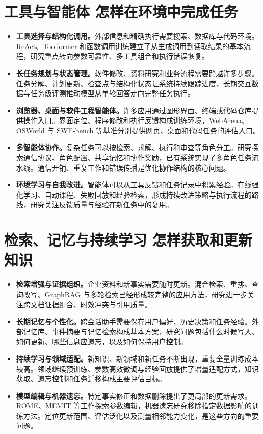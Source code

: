 \section{工具与智能体 怎样在环境中完成任务}

\begin{itemize}
    \item \textbf{工具选择与结构化调用。}外部信息和精确执行需要搜索、数据库与代码环境。ReAct、Toolformer 和函数调用训练建立了从生成调用到读取结果的基本流程，研究重点转向参数可靠性、多工具组合和执行错误恢复。
    \item \textbf{长任务规划与状态管理。}软件修改、资料研究和业务流程需要跨越许多步骤。任务分解、计划更新、检查点与结构化状态让系统持续跟踪进度，长期交互数据与任务级评测推动模型从单轮回答走向完整任务执行。
    \item \textbf{浏览器、桌面与软件工程智能体。}许多应用通过图形界面、终端或代码仓库提供操作入口。界面定位、程序修改和执行反馈构成训练环境，WebArena、OSWorld 与 SWE-bench 等基准分别提供网页、桌面和代码任务的评估入口。
    \item \textbf{多智能体协作。}复杂任务可以按检索、求解、执行和审查等角色分工。研究探索通信协议、角色配置、共享记忆和协作奖励，已有系统实现了多角色任务流水线。通信开销、重复工作和错误传播是优化协作结构的核心问题。
    \item \textbf{环境学习与自我改进。}智能体可以从工具反馈和任务记录中积累经验。在线强化学习、自动课程、失败回放和经验检索，形成持续改进策略与执行流程的路线，研究关注反馈质量与经验在新任务中的复用。
\end{itemize}

\section{检索、记忆与持续学习 怎样获取和更新知识}

\begin{itemize}
    \item \textbf{检索增强与证据组织。}企业资料和新事实需要随时更新。混合检索、重排、查询改写、GraphRAG 与多轮检索已经形成较完整的应用方法，研究进一步关注跨文档证据组合、时效冲突与引用质量。
    \item \textbf{长期记忆与个性化。}跨会话助手需要保存用户偏好、历史决策和任务经验。外部记忆库、事件摘要与记忆检索构成基本方案，研究问题包括什么时候写入、如何更新、哪些信息应遗忘，以及如何保持用户控制。
    \item \textbf{持续学习与领域适配。}新知识、新领域和新任务不断出现，重复全量训练成本较高。领域继续预训练、参数高效微调与经验回放提供了增量适配方式，知识获取、遗忘控制和任务迁移构成主要评估目标。
    \item \textbf{模型编辑与机器遗忘。}特定事实修正和数据删除提出了更局部的更新需求。ROME、MEMIT 等工作探索参数编辑，机器遗忘研究移除指定数据影响的训练方法。定位更新范围、评估泛化以及测量相邻能力变化，是这些方向的重要问题。
\end{itemize}

